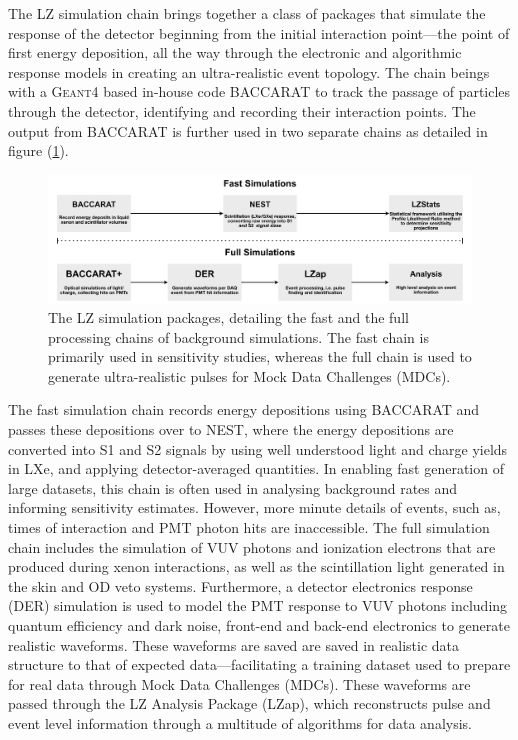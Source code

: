 The LZ simulation chain brings together a class of packages that simulate the response of the detector beginning from the initial interaction point---the point of first energy deposition, all the way through the electronic and algorithmic response models in creating an ultra-realistic event topology. The chain beings with a \textsc{Geant4} based in-house code \textsc{BACCARAT} to track the passage of particles through the detector, identifying and recording their interaction points. The output from \textsc{BACCARAT} is further used in two separate chains as detailed in figure (\ref{fig:lz_simulation_chains}). 

%
\begin{figure}[b]
    \centering
    \hspace*{-0.2cm}
    \includegraphics[scale=0.7]{Chapter_5/Figures/LZ_simulations_chains.png}
    \caption
    {The LZ simulation packages, detailing the fast and the full processing chains of background simulations. The fast chain is primarily used in sensitivity studies, whereas the full chain is used to generate ultra-realistic pulses for Mock Data Challenges (MDCs).}
    \label{fig:lz_simulation_chains}
\end{figure}
%

The fast simulation chain records energy depositions using \textsc{BACCARAT} and passes these depositions over to \textsc{NEST}, where the energy depositions are converted into S1 and S2 signals by using well understood light and charge yields in LXe, and applying detector-averaged quantities. In enabling fast generation of large datasets, this chain is often used in analysing background rates and informing sensitivity estimates. However, more minute details of events, such as, times of interaction and PMT photon hits are inaccessible. The full simulation chain includes the simulation of VUV photons and ionization electrons that are produced during xenon interactions, as well as the scintillation light generated in the skin and OD veto systems. Furthermore, a detector electronics response (DER) simulation is used to model the PMT response to VUV photons including quantum efficiency and dark noise, front-end and back-end electronics to generate realistic waveforms. These waveforms are saved are saved in realistic data structure to that of expected data---facilitating a training dataset used to prepare for real data through Mock Data Challenges (MDCs). These waveforms are passed through the LZ Analysis Package (LZap), which reconstructs pulse and event level information through a multitude of algorithms for data analysis.

